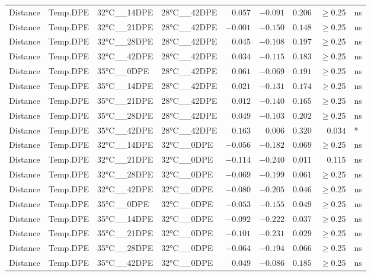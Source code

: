 \documentclass[
]{article}
\begin{document}
\begin{longtable}{llllrrrrl}
Distance & Temp.DPE & 32°C\_\_14DPE & 28°C\_\_42DPE & $0.057$ & $-0.091$ & $0.206$ & $\geq$0.25 & ns \\ 
Distance & Temp.DPE & 32°C\_\_21DPE & 28°C\_\_42DPE & $-0.001$ & $-0.150$ & $0.148$ & $\geq$0.25 & ns \\ 
Distance & Temp.DPE & 32°C\_\_28DPE & 28°C\_\_42DPE & $0.045$ & $-0.108$ & $0.197$ & $\geq$0.25 & ns \\ 
Distance & Temp.DPE & 32°C\_\_42DPE & 28°C\_\_42DPE & $0.034$ & $-0.115$ & $0.183$ & $\geq$0.25 & ns \\ 
Distance & Temp.DPE & 35°C\_\_0DPE & 28°C\_\_42DPE & $0.061$ & $-0.069$ & $0.191$ & $\geq$0.25 & ns \\ 
Distance & Temp.DPE & 35°C\_\_14DPE & 28°C\_\_42DPE & $0.021$ & $-0.131$ & $0.174$ & $\geq$0.25 & ns \\ 
Distance & Temp.DPE & 35°C\_\_21DPE & 28°C\_\_42DPE & $0.012$ & $-0.140$ & $0.165$ & $\geq$0.25 & ns \\ 
Distance & Temp.DPE & 35°C\_\_28DPE & 28°C\_\_42DPE & $0.049$ & $-0.103$ & $0.202$ & $\geq$0.25 & ns \\ 
Distance & Temp.DPE & 35°C\_\_42DPE & 28°C\_\_42DPE & $0.163$ & $0.006$ & $0.320$ & $0.034$ & * \\ 
Distance & Temp.DPE & 32°C\_\_14DPE & 32°C\_\_0DPE & $-0.056$ & $-0.182$ & $0.069$ & $\geq$0.25 & ns \\ 
Distance & Temp.DPE & 32°C\_\_21DPE & 32°C\_\_0DPE & $-0.114$ & $-0.240$ & $0.011$ & $0.115$ & ns \\ 
Distance & Temp.DPE & 32°C\_\_28DPE & 32°C\_\_0DPE & $-0.069$ & $-0.199$ & $0.061$ & $\geq$0.25 & ns \\ 
Distance & Temp.DPE & 32°C\_\_42DPE & 32°C\_\_0DPE & $-0.080$ & $-0.205$ & $0.046$ & $\geq$0.25 & ns \\ 
Distance & Temp.DPE & 35°C\_\_0DPE & 32°C\_\_0DPE & $-0.053$ & $-0.155$ & $0.049$ & $\geq$0.25 & ns \\ 
Distance & Temp.DPE & 35°C\_\_14DPE & 32°C\_\_0DPE & $-0.092$ & $-0.222$ & $0.037$ & $\geq$0.25 & ns \\ 
Distance & Temp.DPE & 35°C\_\_21DPE & 32°C\_\_0DPE & $-0.101$ & $-0.231$ & $0.029$ & $\geq$0.25 & ns \\ 
Distance & Temp.DPE & 35°C\_\_28DPE & 32°C\_\_0DPE & $-0.064$ & $-0.194$ & $0.066$ & $\geq$0.25 & ns \\ 
Distance & Temp.DPE & 35°C\_\_42DPE & 32°C\_\_0DPE & $0.049$ & $-0.086$ & $0.185$ & $\geq$0.25 & ns \\ 

\end{longtable}
\end{document}
